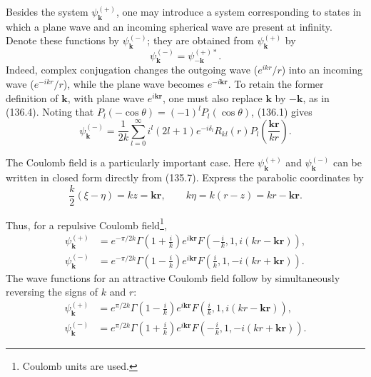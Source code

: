 Besides the system $\psi_{\mathbf k}^{(+)}$, one may introduce a system
corresponding to states in which a plane wave and an incoming spherical wave
are present at infinity. Denote these functions by $\psi_{\mathbf k}^{(-)}$;
they are obtained from $\psi_{\mathbf k}^{(+)}$ by
\begin{equation}
 \psi_{\mathbf k}^{(-)}=\psi_{-\mathbf k}^{(+)*}.
 \tag{136.4}
\end{equation}
Indeed, complex conjugation changes the outgoing wave ($e^{ikr}/r$) into an
incoming wave ($e^{-ikr}/r$), while the plane wave becomes
$e^{-i\mathbf{kr}}$. To retain the former definition of $\mathbf k$, with
plane wave $e^{i\mathbf{kr}}$, one must also replace $\mathbf k$ by
$-\mathbf k$, as in (136.4). Noting that
$P_l(-\cos\theta)=(-1)^lP_l(\cos\theta)$, (136.1) gives
\begin{equation}
 \psi_{\mathbf k}^{(-)}=\frac1{2k}\sum_{l=0}^{\infty}i^l(2l+1)e^{-i\delta_l}R_{kl}(r)
 P_l\left(\frac{\mathbf{kr}}{kr}\right).
 \tag{136.5}
\end{equation}

The Coulomb field is a particularly important case. Here
$\psi_{\mathbf k}^{(+)}$ and $\psi_{\mathbf k}^{(-)}$ can be written in
closed form directly from (135.7). Express the parabolic coordinates by
\[
 \frac{k}{2}(\xi-\eta)=kz=\mathbf{kr},\qquad
 k\eta=k(r-z)=kr-\mathbf{kr}.
\]

Thus, for a repulsive Coulomb field\footnote{Coulomb units are used.},
\begin{align}
 \psi_{\mathbf k}^{(+)}&=e^{-\pi/2k}\Gamma\left(1+\frac{i}{k}\right)e^{i\mathbf{kr}}
 F\left(-\frac{i}{k},1,i(kr-\mathbf{kr})\right), \tag{136.6}\\
 \psi_{\mathbf k}^{(-)}&=e^{-\pi/2k}\Gamma\left(1-\frac{i}{k}\right)e^{i\mathbf{kr}}
 F\left(\frac{i}{k},1,-i(kr+\mathbf{kr})\right). \tag{136.7}
\end{align}
The wave functions for an attractive Coulomb field follow by simultaneously
reversing the signs of $k$ and $r$:
\begin{align}
 \psi_{\mathbf k}^{(+)}&=e^{\pi/2k}\Gamma\left(1-\frac{i}{k}\right)e^{i\mathbf{kr}}
 F\left(\frac{i}{k},1,i(kr-\mathbf{kr})\right), \tag{136.8}\\
 \psi_{\mathbf k}^{(-)}&=e^{\pi/2k}\Gamma\left(1+\frac{i}{k}\right)e^{i\mathbf{kr}}
 F\left(-\frac{i}{k},1,-i(kr+\mathbf{kr})\right). \tag{136.9}
\end{align}

